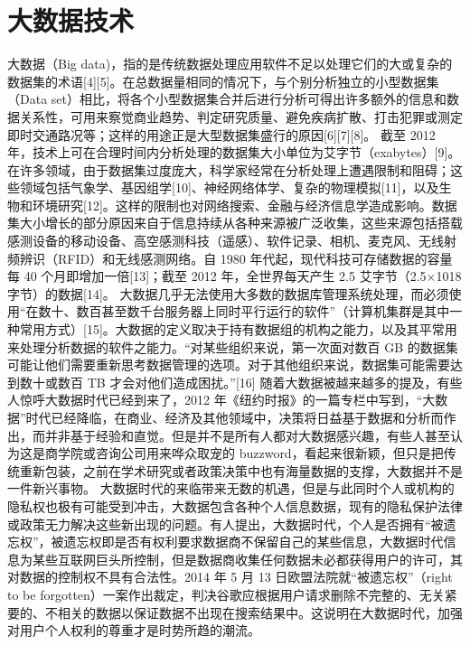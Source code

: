 \documentclass[doctor,secret]{thuthesis}
\begin{document}
\section{大数据技术}
\label{sec:org49fc1d4}
大数据（Big data)，指的是传统数据处理应用软件不足以处理它们的大或复杂的数据集的术语[4][5]。在总数据量相同的情况下，与个别分析独立的小型数据集（Data set）相比，将各个小型数据集合并后进行分析可得出许多额外的信息和数据关系性，可用来察觉商业趋势、判定研究质量、避免疾病扩散、打击犯罪或测定即时交通路况等；这样的用途正是大型数据集盛行的原因[6][7][8]。
截至 2012 年，技术上可在合理时间内分析处理的数据集大小单位为艾字节（exabytes）[9]。在许多领域，由于数据集过度庞大，科学家经常在分析处理上遭遇限制和阻碍；这些领域包括气象学、基因组学[10]、神经网络体学、复杂的物理模拟[11]，以及生物和环境研究[12]。这样的限制也对网络搜索、金融与经济信息学造成影响。数据集大小增长的部分原因来自于信息持续从各种来源被广泛收集，这些来源包括搭载感测设备的移动设备、高空感测科技（遥感）、软件记录、相机、麦克风、无线射频辨识（RFID）和无线感测网络。自 1980 年代起，现代科技可存储数据的容量每 40 个月即增加一倍[13]；截至 2012 年，全世界每天产生 2.5 艾字节（2.5×1018 字节）的数据[14]。
大数据几乎无法使用大多数的数据库管理系统处理，而必须使用“在数十、数百甚至数千台服务器上同时平行运行的软件”（计算机集群是其中一种常用方式）[15]。大数据的定义取决于持有数据组的机构之能力，以及其平常用来处理分析数据的软件之能力。“对某些组织来说，第一次面对数百 GB 的数据集可能让他们需要重新思考数据管理的选项。对于其他组织来说，数据集可能需要达到数十或数百 TB 才会对他们造成困扰。”[16]
随着大数据被越来越多的提及，有些人惊呼大数据时代已经到来了，2012 年《纽约时报》的一篇专栏中写到，“大数据”时代已经降临，在商业、经济及其他领域中，决策将日益基于数据和分析而作出，而并非基于经验和直觉。但是并不是所有人都对大数据感兴趣，有些人甚至认为这是商学院或咨询公司用来哗众取宠的 buzzword，看起来很新颖，但只是把传统重新包装，之前在学术研究或者政策决策中也有海量数据的支撑，大数据并不是一件新兴事物。
大数据时代的来临带来无数的机遇，但是与此同时个人或机构的隐私权也极有可能受到冲击，大数据包含各种个人信息数据，现有的隐私保护法律或政策无力解决这些新出现的问题。有人提出，大数据时代，个人是否拥有“被遗忘权”，被遗忘权即是否有权利要求数据商不保留自己的某些信息，大数据时代信息为某些互联网巨头所控制，但是数据商收集任何数据未必都获得用户的许可，其对数据的控制权不具有合法性。2014 年 5 月 13 日欧盟法院就“被遗忘权”（right to be forgotten）一案作出裁定，判决谷歌应根据用户请求删除不完整的、无关紧要的、不相关的数据以保证数据不出现在搜索结果中。这说明在大数据时代，加强对用户个人权利的尊重才是时势所趋的潮流。
\end{document}
